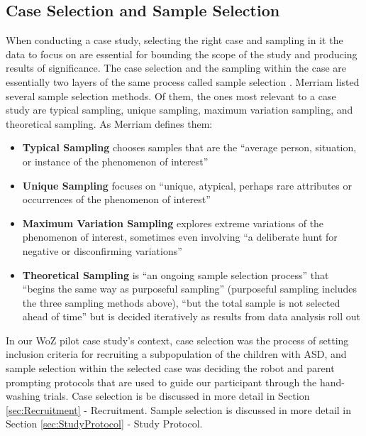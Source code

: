 \documentclass{ut-thesis}
\begin{document}
\subsection{Case Selection and Sample Selection}
\label{sec:CaseSelectionAndSampleSelection}
When conducting a case study, selecting the right case and sampling in it the data to focus on are essential for bounding the scope of the study and producing results of significance.  The case selection and the sampling within the case are essentially two layers of the same process called sample selection \cite{merriam2014qualitative}.  Merriam \cite{merriam2014qualitative} listed several sample selection methods.  Of them, the ones most relevant to a case study are typical sampling, unique sampling, maximum variation sampling, and theoretical sampling. As Merriam defines them:
\begin{itemize}
	\item \textbf{Typical Sampling} chooses samples that are the ``average person, situation, or instance of the phenomenon of interest''
	\item \textbf{Unique Sampling} focuses on ``unique, atypical, perhaps rare attributes or occurrences of the phenomenon of interest''
	\item \textbf{Maximum Variation Sampling} explores extreme variations of the phenomenon of interest, sometimes even involving ``a deliberate hunt for negative or disconfirming variations''
	\item \textbf{Theoretical Sampling}  is ``an ongoing sample selection process'' that ``begins the same way as purposeful sampling'' (purposeful sampling includes the three sampling methods above), ``but the total sample is not selected ahead of time'' but is decided iteratively as results from data analysis roll out
\end{itemize}

In our WoZ pilot case study's context, case selection was the process of setting inclusion criteria for recruiting a subpopulation of the children with ASD, and sample selection within the selected case was deciding the robot and parent prompting protocols that are used to guide our participant through the hand-washing trials.  Case selection is be discussed in more detail in Section \ref{sec:Recruitment} - Recruitment.  Sample selection is discussed in more detail in Section \ref{sec:StudyProtocol} - Study Protocol.
\end{document}
